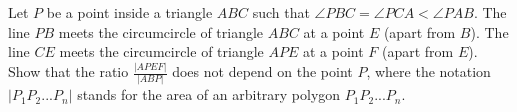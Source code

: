 Let $P$ be a point inside a triangle $ABC$ such that $\angle PBC = \angle PCA < \angle PAB$. The line $PB$ meets the circumcircle of triangle $ABC$ at a point $E$ (apart from $B$). The line $CE$ meets the circumcircle of triangle $APE$ at a point $F$ (apart from $E$). Show that the ratio $\frac{\left|APEF\right|}{\left|ABP\right|}$ does not depend on the point $P$, where the notation $\left|P_1P_2...P_n\right|$ stands for the area of an arbitrary polygon $P_1P_2...P_n$.